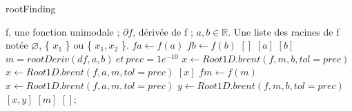 \documentclass[a4paper, 12pt]{article}
\begin{document}

\begin{algorithm}

\caption{rootFinding}
\label{Modele pour un algo}

\begin{algorithmic}

\REQUIRE f, une fonction unimodale ; \( \partial f \), dérivée de f ; \( a, b  \in \mathbb{R} \).
\ENSURE Une liste des racines de f notée \( \varnothing \), \{ \( x_1 \) \} ou \{ \( x_1, x_2 \) \}.
\STATE \( fa \leftarrow f(a) \)
\STATE \( fb \leftarrow f(b) \)
	\RETURN  $[]$
	\RETURN $[a]$
	\RETURN $[b]$
\ELSE
	\STATE \( m = rootDeriv(df, a, b) ~ et ~ prec = 1e^{-10}\)
		\STATE \( x \leftarrow Root1D.brent(f, m, b, tol=prec) \)
		\STATE \( x \leftarrow Root1D.brent(f, a, m, tol=prec) \)
		\RETURN $[x]$
	\ELSE
		\STATE \( fm \leftarrow f(m) \)
			\STATE \( x \leftarrow Root1D.brent(f, a, m, tol=prec) \)
			\STATE \( y \leftarrow Root1D.brent(f, m, b, tol=prec) \)
			\RETURN $[x, y]$
			\RETURN $[m]$
		\ELSE
			\RETURN $[]$;
		\ENDIF
	\ENDIF
\ENDIF

\end{algorithmic}

\end{algorithm}
\end{document}
